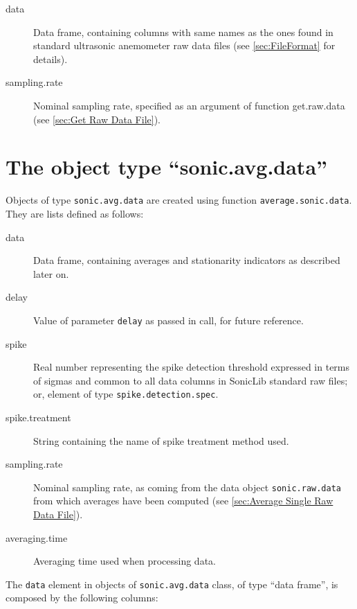 \documentclass[a4paper,10pt]{book}
\begin{document}
\begin{description}
 \item[data] Data frame, containing columns with same names as the ones found in standard ultrasonic anemometer raw data files (see \ref{sec:FileFormat} for details).
 \item[sampling.rate] Nominal sampling rate, specified as an argument of function get.raw.data (see \ref{sec:Get Raw Data File}).
\end{description}


\section{The object type ``sonic.avg.data''}
\label{sec:sonic.avg.data}

Objects of type \verb|sonic.avg.data| are created using function \verb|average.sonic.data|. They are lists defined as follows:

\begin{description}
 \item[data] Data frame, containing averages and stationarity indicators as described later on.
 \item[delay] Value of parameter \verb|delay| as passed in call, for future reference.
 \item[spike] Real number representing the spike detection threshold expressed in terms of sigmas and common to all data columns in SonicLib standard raw files; or, element of type \verb|spike.detection.spec|.
 \item[spike.treatment] String containing the name of spike treatment method used.
 \item[sampling.rate] Nominal sampling rate, as coming from the data object \verb|sonic.raw.data| from which averages have been computed (see \ref{sec:Average Single Raw Data File}).
 \item[averaging.time] Averaging time used when processing data.
\end{description}

The \verb|data| element in objects of \verb|sonic.avg.data| class, of type ``data frame'', is composed by the following columns:
\end{document}
